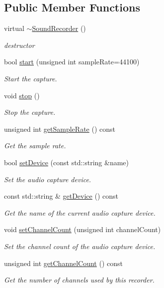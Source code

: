 \subsection*{Public Member Functions}
\begin{DoxyCompactItemize}
\item 
virtual \mbox{\hyperlink{classsf_1_1_sound_recorder_acc599e61aaa47edaae88cf43f0a43549}{$\sim$\+Sound\+Recorder}} ()
\begin{DoxyCompactList}\small\item\em destructor \end{DoxyCompactList}\item 
bool \mbox{\hyperlink{classsf_1_1_sound_recorder_a715f0fd2f228c83d79aaedca562ae51f}{start}} (unsigned int sample\+Rate=44100)
\begin{DoxyCompactList}\small\item\em Start the capture. \end{DoxyCompactList}\item 
void \mbox{\hyperlink{classsf_1_1_sound_recorder_a8d9c8346aa9aa409cfed4a1101159c4c}{stop}} ()
\begin{DoxyCompactList}\small\item\em Stop the capture. \end{DoxyCompactList}\item 
unsigned int \mbox{\hyperlink{classsf_1_1_sound_recorder_aed292c297a3e0d627db4eb5c18f58c44}{get\+Sample\+Rate}} () const
\begin{DoxyCompactList}\small\item\em Get the sample rate. \end{DoxyCompactList}\item 
bool \mbox{\hyperlink{classsf_1_1_sound_recorder_a8eb3e473292c16e874322815836d3cd3}{set\+Device}} (const std\+::string \&name)
\begin{DoxyCompactList}\small\item\em Set the audio capture device. \end{DoxyCompactList}\item 
const std\+::string \& \mbox{\hyperlink{classsf_1_1_sound_recorder_ab16cd53c6884cbf3380c017cee72ba81}{get\+Device}} () const
\begin{DoxyCompactList}\small\item\em Get the name of the current audio capture device. \end{DoxyCompactList}\item 
void \mbox{\hyperlink{classsf_1_1_sound_recorder_ae4e22ba67d12a74966eb05fad55a317c}{set\+Channel\+Count}} (unsigned int channel\+Count)
\begin{DoxyCompactList}\small\item\em Set the channel count of the audio capture device. \end{DoxyCompactList}\item 
unsigned int \mbox{\hyperlink{classsf_1_1_sound_recorder_a610e98e7a73b316ce26b7c55234f86e9}{get\+Channel\+Count}} () const
\begin{DoxyCompactList}\small\item\em Get the number of channels used by this recorder. \end{DoxyCompactList}\end{DoxyCompactItemize}

